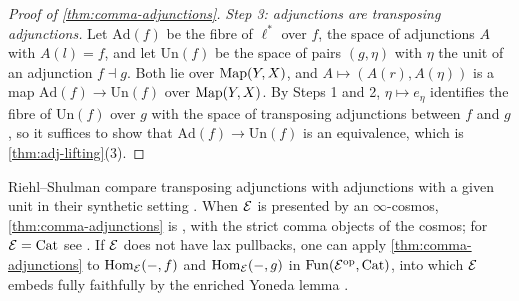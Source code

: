 \begin{proof}[Proof of \cref{thm:comma-adjunctions}]
\emph{Step 3: adjunctions are transposing adjunctions.} Let $\mathrm{Ad}(f)$ be
the fibre of $\ell^{*}$ over $f$, the space of adjunctions $A$ with $A(l) = f$,
and let $\mathrm{Un}(f)$ be the space of pairs $(g,\eta)$ with $\eta$ the unit
of an adjunction $f \dashv g$. Both lie over $\operatorname{Map}(Y,X)$, and
$A \mapsto (A(r),A(\eta))$
is a map
$\mathrm{Ad}(f) \to \mathrm{Un}(f)$
over $\operatorname{Map}(Y,X)$. By Steps 1 and 2,
$\eta \mapsto e_{\eta}$
identifies the fibre of $\mathrm{Un}(f)$ over $g$ with the space of transposing
adjunctions between $f$ and $g$, so it suffices to show that
$\mathrm{Ad}(f) \to \mathrm{Un}(f)$
is an equivalence, which is \cref{thm:adj-lifting}(3).
\end{proof}

\begin{rmk}
\label{rmk:comma-literature}
%
Riehl--Shulman compare transposing adjunctions with adjunctions with a given
unit in their synthetic setting \cite[Cor.~11.21,
Thm.~11.23]{riehlshulman2017synthetic}. When $\mathcal{E}$ is presented by an
$\infty$-cosmos, \cref{thm:comma-adjunctions} is
\cite[Prop.~4.1.1]{riehlverity2022elements},
with the strict comma objects of the cosmos;
for $\mathcal{E} = \mathrm{Cat}$ see \cite[Prop.~4.4.3]{riehlverity2015twocategory}.
If $\mathcal{E}$ does not have lax pullbacks, one can apply
\cref{thm:comma-adjunctions} to $\operatorname{Hom}_{\mathcal{E}}(-,f)$ and $\operatorname{Hom}_{\mathcal{E}}(-,g)$ in
$\operatorname{Fun}(\mathcal{E}^{\mathrm{op}},\mathrm{Cat})$, into which $\mathcal{E}$ embeds fully faithfully by the enriched
Yoneda lemma \cite{hinich2020yoneda,heine2023enriched}.
\end{rmk}
